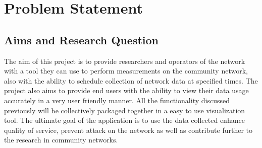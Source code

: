 \section{Problem Statement}
\subsection{Aims and Research Question}
The aim of this project is to provide researchers and operators of the network with a tool they can use to perform measurements on the community network, also with the ability to schedule collection of network data at specified times. The project also aims to provide end users with the ability to view their data usage accurately in a very user friendly manner. All the functionality discussed previously will be collectively packaged together in a easy to use visualization tool. The ultimate goal of the application is to use the data collected enhance quality of service, prevent attack on the network as well as contribute further to the research in community networks.

